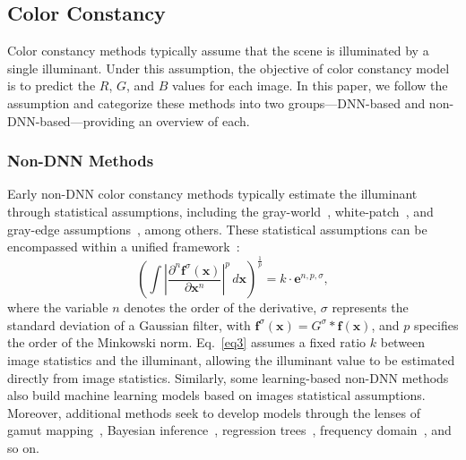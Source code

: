 \subsection{Color Constancy} \label{sec2.2}
Color constancy methods typically assume that the scene is illuminated by a single illuminant. Under this assumption, the objective of color constancy model is to predict the $R$, $G$, and $B$ values for each image. In this paper, we follow the assumption and categorize these methods into two groups—DNN-based and non-DNN-based—providing an overview of each.

\subsubsection{Non-DNN Methods} \label{sec2.2.1}
Early non-DNN color constancy methods typically estimate the illuminant through statistical assumptions, including the gray-world~\cite{buchsbaum1980spatial}, white-patch~\cite{land1977retinex}, and gray-edge assumptions~\cite{van2007edge}, among others. These statistical assumptions can be encompassed within a unified framework~\cite{van2007edge}:
\begin{equation} \label{eq3}
\left( \int \left| \frac{\partial^n \boldsymbol{f}^{\sigma}(\boldsymbol{x})}{\partial \boldsymbol{x}^n} \right|^p \, d\boldsymbol{x} \right)^{\frac{1}{p}} = k \cdot \boldsymbol{e}^{n,p,\sigma},
\end{equation}
where the variable \( n \) denotes the order of the derivative, \( \sigma \) represents the standard deviation of a Gaussian filter, with \( \boldsymbol{f}^{\sigma}(\boldsymbol{x}) = G^{\sigma} * \boldsymbol{f}(\boldsymbol{x}) \), and \( p \) specifies the order of the Minkowski norm. 
Eq.~\ref{eq3} assumes a fixed ratio \( k \) between image statistics and the illuminant, allowing the illuminant value to be estimated directly from image statistics.
Similarly, some learning-based non-DNN methods~\cite{li2023ranking, xie2022improving, xie2023camera} also build machine learning models based on images statistical assumptions. Moreover, additional methods seek to develop models through the lenses of gamut mapping~\cite{forsyth1990novel, gijsenij2010generalized}, Bayesian inference~\cite{gehler2008bayesian}, regression trees~\cite{cheng2015effective}, frequency domain~\cite{barron2017fast}, and so on.

